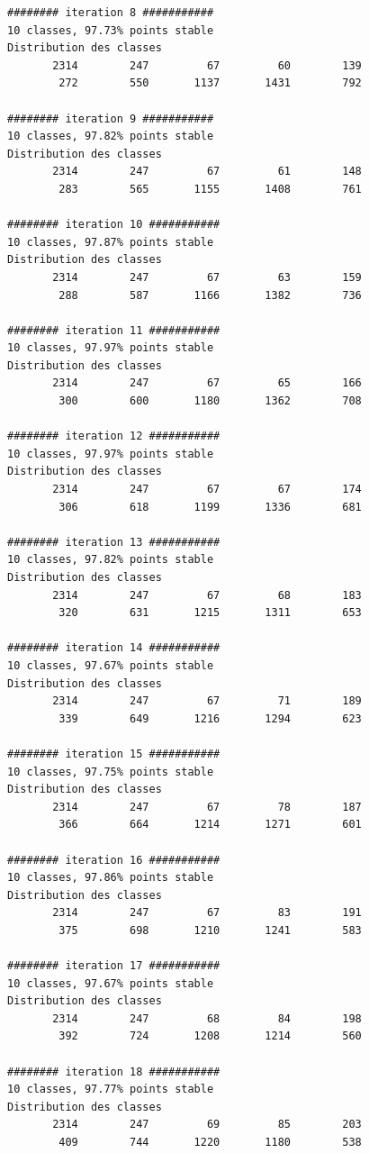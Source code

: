 \documentclass[earth,article,submit,pdftex,moreauthors]{Definitions/mdpi}
\begin{document}
{\begin{scriptsize}
\begin{verbatim}
######## iteration 8 ###########
10 classes, 97.73% points stable
Distribution des classes
       2314        247         67         60        139
        272        550       1137       1431        792

######## iteration 9 ###########
10 classes, 97.82% points stable
Distribution des classes
       2314        247         67         61        148
        283        565       1155       1408        761

######## iteration 10 ###########
10 classes, 97.87% points stable
Distribution des classes
       2314        247         67         63        159
        288        587       1166       1382        736

######## iteration 11 ###########
10 classes, 97.97% points stable
Distribution des classes
       2314        247         67         65        166
        300        600       1180       1362        708

######## iteration 12 ###########
10 classes, 97.97% points stable
Distribution des classes
       2314        247         67         67        174
        306        618       1199       1336        681

######## iteration 13 ###########
10 classes, 97.82% points stable
Distribution des classes
       2314        247         67         68        183
        320        631       1215       1311        653

######## iteration 14 ###########
10 classes, 97.67% points stable
Distribution des classes
       2314        247         67         71        189
        339        649       1216       1294        623

######## iteration 15 ###########
10 classes, 97.75% points stable
Distribution des classes
       2314        247         67         78        187
        366        664       1214       1271        601

######## iteration 16 ###########
10 classes, 97.86% points stable
Distribution des classes
       2314        247         67         83        191
        375        698       1210       1241        583

######## iteration 17 ###########
10 classes, 97.67% points stable
Distribution des classes
       2314        247         68         84        198
        392        724       1208       1214        560

######## iteration 18 ###########
10 classes, 97.77% points stable
Distribution des classes
       2314        247         69         85        203
        409        744       1220       1180        538


\end{verbatim}
\end{scriptsize}}
\end{document}
